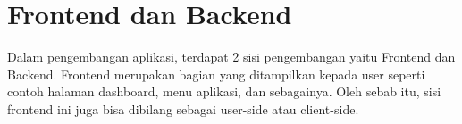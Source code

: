 		


		



\section{Frontend dan Backend}

Dalam pengembangan aplikasi, terdapat 2 sisi pengembangan yaitu Frontend dan Backend. Frontend merupakan bagian yang ditampilkan kepada user seperti contoh halaman dashboard, menu aplikasi, dan sebagainya. Oleh sebab itu, sisi frontend ini juga bisa dibilang sebagai user-side atau client-side.

